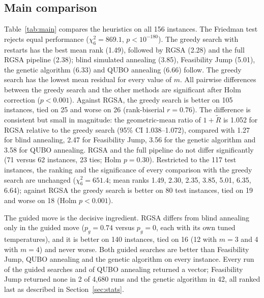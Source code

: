\documentclass[pdflatex,sn-mathphys-num]{sn-jnl}
\theoremstyle{thmstyleone}
\theoremstyle{thmstylethree}
\begin{document}
\subsection{Main comparison}\label{sec:res-main}
Table~\ref{tab:main} compares the heuristics on all 156 instances. The Friedman test rejects equal performance ($\chi^2_6=869.1$, $p<10^{-180}$). The greedy search with restarts has the best mean rank (1.49), followed by RGSA (2.28) and the full RGSA pipeline (2.38); blind simulated annealing (3.85), Feasibility Jump (5.01), the genetic algorithm (6.33) and QUBO annealing (6.66) follow. The greedy search has the lowest mean residual for every value of $m$. All pairwise differences between the greedy search and the other methods are significant after Holm correction ($p<0.001$). Against RGSA, the greedy search is better on 105 instances, tied on 25 and worse on 26 (rank-biserial $r=0.76$). The difference is consistent but small in magnitude: the geometric-mean ratio of $1+\tilde R$ is 1.052 for RGSA relative to the greedy search (95\% CI 1.038--1.072), compared with 1.27 for blind annealing, 2.47 for Feasibility Jump, 3.56 for the genetic algorithm and 3.58 for QUBO annealing. RGSA and the full pipeline do not differ significantly (71 versus 62 instances, 23 ties; Holm $p=0.30$). Restricted to the 117 test instances, the ranking and the significance of every comparison with the greedy search are unchanged ($\chi^2_6=651.4$; mean ranks 1.49, 2.30, 2.35, 3.85, 5.01, 6.35, 6.64); against RGSA the greedy search is better on 80 test instances, tied on 19 and worse on 18 (Holm $p<0.001$).



The guided move is the decisive ingredient. RGSA differs from blind annealing only in the guided move ($p_g=0.74$ versus $p_g=0$, each with its own tuned temperatures), and it is better on 140 instances, tied on 16 (12 with $m=3$ and 4 with $m=4$) and never worse. Both guided searches are better than Feasibility Jump, QUBO annealing and the genetic algorithm on every instance. Every run of the guided searches and of QUBO annealing returned a vector; Feasibility Jump returned none in 2 of 4{,}680 runs and the genetic algorithm in 42, all ranked last as described in Section~\ref{sec:stats}.
\end{document}
